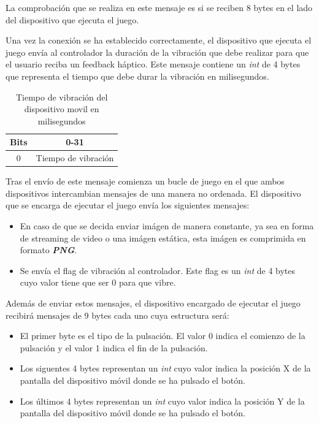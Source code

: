 La comprobaci\'on que se realiza en este mensaje es si se reciben 8 bytes en el lado del dispositivo que ejecuta el juego.

Una vez la conexi\'on se ha establecido correctamente, el dispositivo que ejecuta el juego env\'ia al controlador la duraci\'on de la vibraci\'on que debe realizar para que el usuario reciba un feedback h\'aptico. Este mensaje contiene un \textit{int} de 4 bytes que representa el tiempo que debe durar la vibraci\'on en milisegundos.

\begin{table}[h!]
\centering
\begin{tabular}{|l|c|} 
\hline
Bits                    & 0-31                 \\
\hline
\multicolumn{1}{|c|}{0} & Tiempo de vibraci\'on  \\
\hline
\end{tabular}
\caption{Tiempo de vibraci\'on del dispositivo movil en milisegundos}
\label{table:2}
\end{table}

Tras el env\'io de este mensaje comienza un bucle de juego en el que ambos dispositivos intercambian mensajes de una manera no ordenada. El dispositivo que se encarga de ejecutar el juego env\'ia los siguientes mensajes:
\begin {itemize}
\item En caso de que se decida enviar im\'agen de manera constante, ya sea en forma de streaming de video o una im\'agen est\'atica, esta im\'agen es comprimida en formato \textbf{\textit{PNG}}.
\item Se env\'ia el flag de vibraci\'on al controlador. Este flag es un \textit{int} de 4 bytes cuyo valor tiene que ser 0 para que vibre.
\end {itemize}

Adem\'as de enviar estos mensajes, el dispositivo encargado de ejecutar el juego recibir\'a mensajes de 9 bytes cada uno cuya estructura ser\'a:
\begin {itemize}
\item El primer byte es el tipo de la pulsaci\'on. El valor 0 indica el comienzo de la pulsaci\'on y el valor 1 indica el fin de la pulsaci\'on.
\item Los siguentes 4 bytes representan un \textit{int} cuyo valor indica la posici\'on X de la pantalla del dispositivo m\'ovil donde se ha pulsado el bot\'on.
\item Los \'ultimos 4 bytes representan un \textit{int} cuyo valor indica la posici\'on Y de la pantalla del dispositivo m\'ovil donde se ha pulsado el bot\'on.
\end {itemize}

